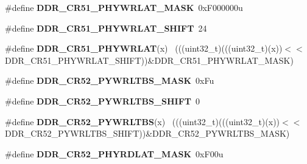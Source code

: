 \begin{DoxyCompactItemize}
\item 
\hypertarget{group___d_d_r___register___masks_ga7d48fd2fe30f9e36786cc5bcf0fadd05}{}\#define {\bfseries D\+D\+R\+\_\+\+C\+R51\+\_\+\+P\+H\+Y\+W\+R\+L\+A\+T\+\_\+\+M\+A\+S\+K}~0x\+F000000u\label{group___d_d_r___register___masks_ga7d48fd2fe30f9e36786cc5bcf0fadd05}

\item 
\hypertarget{group___d_d_r___register___masks_ga262889062dd32c116fe4759a17fd62f9}{}\#define {\bfseries D\+D\+R\+\_\+\+C\+R51\+\_\+\+P\+H\+Y\+W\+R\+L\+A\+T\+\_\+\+S\+H\+I\+F\+T}~24\label{group___d_d_r___register___masks_ga262889062dd32c116fe4759a17fd62f9}

\item 
\hypertarget{group___d_d_r___register___masks_ga9f1b875e76b2e40c2270454f7a9d64e0}{}\#define {\bfseries D\+D\+R\+\_\+\+C\+R51\+\_\+\+P\+H\+Y\+W\+R\+L\+A\+T}(x)                                      ~(((uint32\+\_\+t)(((uint32\+\_\+t)(x))$<$$<$D\+D\+R\+\_\+\+C\+R51\+\_\+\+P\+H\+Y\+W\+R\+L\+A\+T\+\_\+\+S\+H\+I\+F\+T))\&D\+D\+R\+\_\+\+C\+R51\+\_\+\+P\+H\+Y\+W\+R\+L\+A\+T\+\_\+\+M\+A\+S\+K)\label{group___d_d_r___register___masks_ga9f1b875e76b2e40c2270454f7a9d64e0}

\item 
\hypertarget{group___d_d_r___register___masks_gaaa43914e01a1fb779110cf16d58522e8}{}\#define {\bfseries D\+D\+R\+\_\+\+C\+R52\+\_\+\+P\+Y\+W\+R\+L\+T\+B\+S\+\_\+\+M\+A\+S\+K}~0x\+Fu\label{group___d_d_r___register___masks_gaaa43914e01a1fb779110cf16d58522e8}

\item 
\hypertarget{group___d_d_r___register___masks_ga5e50c5acb4108433ede93c21da68db1b}{}\#define {\bfseries D\+D\+R\+\_\+\+C\+R52\+\_\+\+P\+Y\+W\+R\+L\+T\+B\+S\+\_\+\+S\+H\+I\+F\+T}~0\label{group___d_d_r___register___masks_ga5e50c5acb4108433ede93c21da68db1b}

\item 
\hypertarget{group___d_d_r___register___masks_ga578af60353e024a02e5380250fde962d}{}\#define {\bfseries D\+D\+R\+\_\+\+C\+R52\+\_\+\+P\+Y\+W\+R\+L\+T\+B\+S}(x)                                      ~(((uint32\+\_\+t)(((uint32\+\_\+t)(x))$<$$<$D\+D\+R\+\_\+\+C\+R52\+\_\+\+P\+Y\+W\+R\+L\+T\+B\+S\+\_\+\+S\+H\+I\+F\+T))\&D\+D\+R\+\_\+\+C\+R52\+\_\+\+P\+Y\+W\+R\+L\+T\+B\+S\+\_\+\+M\+A\+S\+K)\label{group___d_d_r___register___masks_ga578af60353e024a02e5380250fde962d}

\item 
\hypertarget{group___d_d_r___register___masks_ga1e2110fbbe93aaea128748182343022f}{}\#define {\bfseries D\+D\+R\+\_\+\+C\+R52\+\_\+\+P\+H\+Y\+R\+D\+L\+A\+T\+\_\+\+M\+A\+S\+K}~0x\+F00u\label{group___d_d_r___register___masks_ga1e2110fbbe93aaea128748182343022f}


\end{DoxyCompactItemize}

